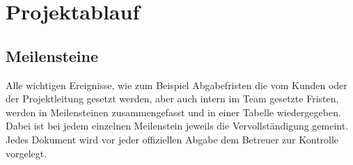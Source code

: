 
\chapter{Projektablauf}

\section{Meilensteine}

Alle wichtigen Ereignisse, wie zum Beispiel Abgabefristen die vom Kunden oder der Projektleitung gesetzt werden, aber auch intern im Team gesetzte Fristen, werden 
in Meilensteinen zusammengefasst und in einer Tabelle wiedergegeben. Dabei ist bei jedem einzelnen Meilenstein jeweils die Vervollst\"andigung gemeint.
Jedes Dokument wird vor jeder offiziellen Abgabe dem Betreuer zur Kontrolle vorgelegt.

